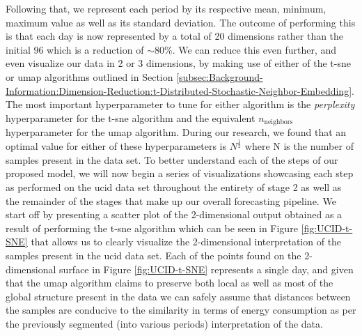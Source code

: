\begin{adjustwidth}{-1.65cm}{-0.0cm}
\begin{enumerate}[label=Step 2.\arabic*:, leftmargin=*]
        \noindent \newline Following that, we represent each period by its respective mean, minimum, maximum value as well as its standard deviation. The outcome of performing this is that each day is now represented by a total of 20 dimensions rather than the initial 96 which is a reduction of $\sim 80\%$. We can reduce this even further, and even visualize our data in 2 or 3 dimensions, by making use of either of the \gls{t-sne} or \gls{umap} algorithms outlined in Section \ref{subsec:Background-Information:Dimension-Reduction:t-Distributed-Stochastic-Neighbor-Embedding}. The most important hyperparameter to tune for either algorithm is the \textit{perplexity} hyperparameter for the \gls{t-sne} algorithm and the equivalent $n_{\text{neighbors}}$ hyperparameter for the \gls{umap} algorithm. During our research, we found that an optimal value for either of these hyperparameters is $N^{\frac{1}{2}}$ where N is the number of samples present in the data set. To better understand each of the steps of our proposed model, we will now begin a series of visualizations showcasing each step as performed on the \gls{ucid} data set throughout the entirety of stage 2 as well as the remainder of the stages that make up our overall forecasting pipeline. We start off by presenting a scatter plot of the 2-dimensional output obtained as a result of performing the \gls{t-sne} algorithm which can be seen in Figure \ref{fig:UCID-t-SNE} that allows us to clearly visualize the 2-dimensional interpretation of the samples present in the \gls{ucid} data set. Each of the points found on the 2-dimensional surface in Figure \ref{fig:UCID-t-SNE} represents a single day, and given that the \gls{umap} algorithm claims to preserve both local as well as most of the global structure present in the data we can safely assume that distances between the samples are conducive to the similarity in terms of energy consumption as per the previously segmented (into various periods) interpretation of the data.
        

\end{enumerate}
\end{adjustwidth}
